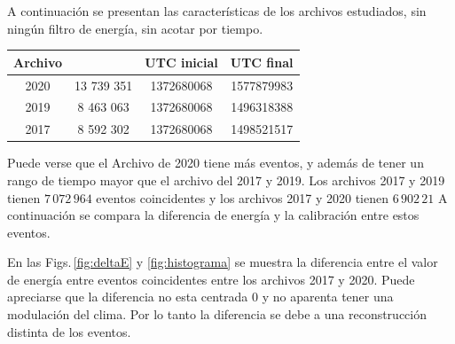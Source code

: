 
			A continuación se presentan las características de los archivos estudiados, sin ningún filtro de energía, sin acotar por tiempo. 

			\begin{table}[H]
			\centering
				\begin{tabular}{c|c|c|c}
				\textbf{Archivo} & \text{Eventos} & UTC inicial &  UTC final  \\ \hline
				2020			 & 13 739 351	  &  1372680068	&  1577879983 \\
				2019			 & 	8 463 063	  &	 1372680068 &  1496318388 \\
				2017			 &	8 592 302	  &  1372680068 &  1498521517 \\
					\end{tabular}
			\end{table}
			
			Puede verse que el Archivo de 2020 tiene más eventos, y además de tener un rango de tiempo mayor que el archivo del 2017 y 2019. Los archivos 2017 y 2019  tienen $7\,072\,964$ eventos coincidentes y los archivos 2017 y 2020 tienen $6\,902\,21$ A continuación se compara la diferencia de energía y la calibración entre estos eventos.

			En las  Figs.\,\ref{fig:deltaE} y \ref{fig:histograma} se muestra la diferencia entre el valor de energía entre eventos coincidentes entre los archivos 2017 y 2020. Puede apreciarse que la diferencia no esta centrada 0 y no aparenta tener una modulación del clima. Por lo tanto la diferencia se debe a una reconstrucción distinta de los eventos.

